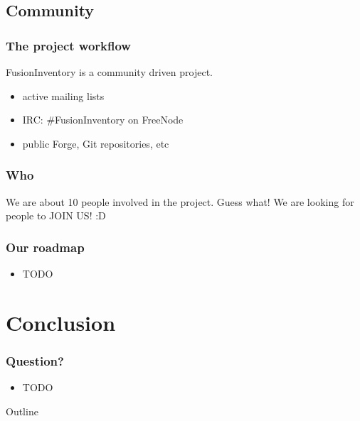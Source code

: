 \documentclass{beamer}
\begin{document}
\subsection{Community}
\begin{frame}
\frametitle{The project workflow}
FusionInventory is a community driven project.

\begin{itemize}

\item active mailing lists
\item IRC: \#FusionInventory on FreeNode
\item public Forge, Git repositories, etc

\end{itemize}
\end{frame}
\begin{frame}
\frametitle{Who}

We are about 10 people involved in the project.
\pause
Guess what!
\pause
We are looking for people to JOIN US! :D

\end{frame}
\begin{frame}

\frametitle{Our roadmap}
%
\begin{itemize}
%
\item TODO
%
\end{itemize}
\end{frame}

\section{Conclusion}
%
\begin{frame}
\frametitle{Question?}
%
\begin{itemize}
%
\item TODO
%
\end{itemize}
\end{frame}

\begin{frame}[shrink=20]{Outline}

\tableofcontents
\end{frame}
\end{document}
